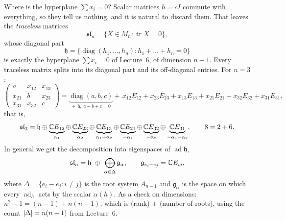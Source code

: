 Where is the hyperplane $\sum x_i=0$? Scalar matrices $h=cI$ commute with everything, so they tell us
nothing, and it is natural to discard them. That leaves the \emph{traceless} matrices
\[
  \mathfrak{sl}_n=\{X\in M_n:\operatorname{tr}X=0\},
\]
whose diagonal part
\[
  \mathfrak h=\{\operatorname{diag}(h_1,\dots,h_n): h_1+\dots+h_n=0\}
\]
is exactly the hyperplane $\sum x_i=0$ of Lecture~6, of dimension $n-1$. Every traceless matrix splits
into its diagonal part and its off-diagonal entries. For $n=3$:
\[
  \begin{pmatrix}a&x_{12}&x_{13}\\x_{21}&b&x_{23}\\x_{31}&x_{32}&c\end{pmatrix}
  =\underbrace{\operatorname{diag}(a,b,c)}_{\in\,\mathfrak h,\ a+b+c=0}
  +\,x_{12}E_{12}+x_{23}E_{23}+x_{13}E_{13}+x_{21}E_{21}+x_{32}E_{32}+x_{31}E_{31},
\]
that is,
\[
  \mathfrak{sl}_3=\mathfrak h\oplus\underbrace{\mathbb{C} E_{12}}_{\alpha_1}\oplus\underbrace{\mathbb{C} E_{23}}_{\alpha_2}
  \oplus\underbrace{\mathbb{C} E_{13}}_{\alpha_1+\alpha_2}\oplus\underbrace{\mathbb{C} E_{21}}_{-\alpha_1}
  \oplus\underbrace{\mathbb{C} E_{32}}_{-\alpha_2}\oplus\underbrace{\mathbb{C} E_{31}}_{-\alpha_1-\alpha_2},
  \qquad 8=2+6.
\]
In general we get the decomposition into eigenspaces of $\operatorname{ad}\mathfrak h$,
\begin{equation}\label{LIE:eq:rootdecomp}
  \mathfrak{sl}_n=\mathfrak h\ \oplus\ \bigoplus_{\alpha\in\Delta}\mathfrak g_\alpha,
  \qquad
  \mathfrak g_{e_i-e_j}=\C E_{ij},
\end{equation}
where $\Delta=\{e_i-e_j: i\neq j\}$ is the root system $A_{n-1}$ and $\mathfrak g_\alpha$ is the space on
which every $\operatorname{ad}_h$ acts by the scalar $\alpha(h)$. As a check on dimensions:
$n^2-1=(n-1)+n(n-1)$, which is (rank) $+$ (number of roots), using the count
$\left\lvert \Delta \right\rvert=n(n-1)$ from Lecture~6.

